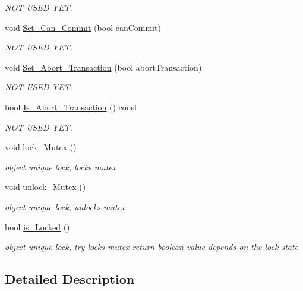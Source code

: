 \begin{DoxyCompactItemize}
\begin{DoxyCompactList}\small\item\em N\+OT U\+S\+ED Y\+ET. \end{DoxyCompactList}\item 
void \hyperlink{class_o_s_t_m_a813ee61c9d1c83c6a6ae30d12aca8a5d}{Set\+\_\+\+Can\+\_\+\+Commit} (bool can\+Commit)
\begin{DoxyCompactList}\small\item\em N\+OT U\+S\+ED Y\+ET. \end{DoxyCompactList}\item 
void \hyperlink{class_o_s_t_m_aba384cf65c5f56f5b86833730c3c6ea4}{Set\+\_\+\+Abort\+\_\+\+Transaction} (bool abort\+Transaction)
\begin{DoxyCompactList}\small\item\em N\+OT U\+S\+ED Y\+ET. \end{DoxyCompactList}\item 
bool \hyperlink{class_o_s_t_m_afc2851abf5342c3c67342c2c14820115}{Is\+\_\+\+Abort\+\_\+\+Transaction} () const 
\begin{DoxyCompactList}\small\item\em N\+OT U\+S\+ED Y\+ET. \end{DoxyCompactList}\item 
void \hyperlink{class_o_s_t_m_af192c598a3c647f37aaba5757e60240f}{lock\+\_\+\+Mutex} ()
\begin{DoxyCompactList}\small\item\em object unique lock, locks mutex \end{DoxyCompactList}\item 
void \hyperlink{class_o_s_t_m_a6cd703bc26c719fd95b4f5362d050762}{unlock\+\_\+\+Mutex} ()
\begin{DoxyCompactList}\small\item\em object unique lock, unlocks mutex \end{DoxyCompactList}\item 
bool \hyperlink{class_o_s_t_m_afb6520023ed2c4a6188b688c46f192d0}{is\+\_\+\+Locked} ()
\begin{DoxyCompactList}\small\item\em object unique lock, try locks mutex return boolean value depends on the lock state \end{DoxyCompactList}\end{DoxyCompactItemize}


\subsection{Detailed Description}


